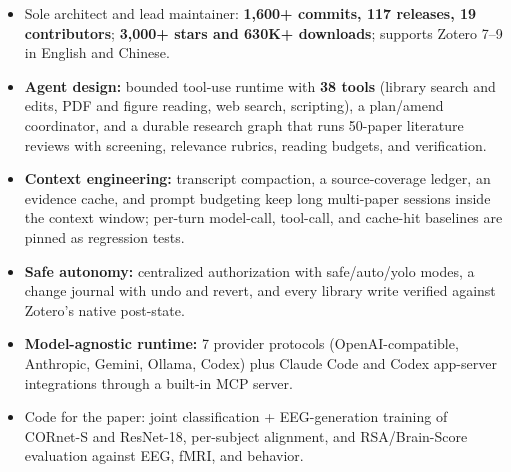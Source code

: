 \begin{itemize}
  \item Sole architect and lead maintainer: \textbf{1,600+ commits, 117 releases, 19 contributors}; \textbf{3,000+ stars and 630K+ downloads}; supports Zotero 7--9 in English and Chinese.
  \item \textbf{Agent design:} bounded tool-use runtime with \textbf{38 tools} (library search and edits, PDF and figure reading, web search, scripting), a plan/amend coordinator, and a durable research graph that runs 50-paper literature reviews with screening, relevance rubrics, reading budgets, and verification.
  \item \textbf{Context engineering:} transcript compaction, a source-coverage ledger, an evidence cache, and prompt budgeting keep long multi-paper sessions inside the context window; per-turn model-call, tool-call, and cache-hit baselines are pinned as regression tests.
  \item \textbf{Safe autonomy:} centralized authorization with safe/auto/yolo modes, a change journal with undo and revert, and every library write verified against Zotero's native post-state.
  \item \textbf{Model-agnostic runtime:} 7 provider protocols (OpenAI-compatible, Anthropic, Gemini, Ollama, Codex) plus Claude Code and Codex app-server integrations through a built-in MCP server.
\end{itemize}
\entrygap
{}
\begin{itemize}
  \item Code for the  paper: joint classification + EEG-generation training of CORnet-S and ResNet-18, per-subject alignment, and RSA/Brain-Score evaluation against EEG, fMRI, and behavior.
\end{itemize}
